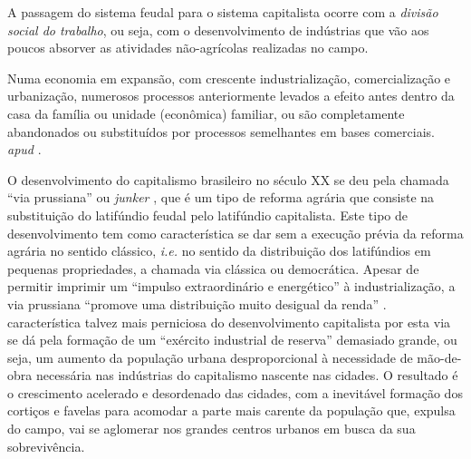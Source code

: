\documentclass[
	12pt,				%
	oneside,			%
	a4paper,			%
	chapter=TITLE,		%
	section=TITLE,		%
	english,			%
	brazil				%
	]{abntex2}
\begin{document}
A passagem do sistema feudal para o sistema capitalista ocorre com a
\emph{divisão social do trabalho}, ou seja, com o desenvolvimento de
indústrias que vão aos poucos absorver as atividades não-agrícolas
realizadas no campo.
\begin{citacao}
Numa economia em expansão, com crescente industrialização, comercialização e
urbanização, numerosos processos anteriormente levados a efeito antes dentro da
casa da família ou unidade (econômica) familiar, ou são completamente
abandonados ou substituídos por processos semelhantes em bases
comerciais. \cite[p. 41]{kuznets} \textit{apud} \cite[p. 218]{rangel1956}.
\end{citacao}
O desenvolvimento do capitalismo brasileiro no século XX se deu pela
chamada ``via prussiana'' ou \emph{junker} \autocite[155]{rangel1988},
que é um tipo de reforma agrária que consiste na substituição do
latifúndio feudal pelo latifúndio capitalista. Este tipo de
desenvolvimento tem como característica se dar sem a execução prévia da
reforma agrária no sentido clássico, \emph{i.e.} no sentido da
distribuição dos latifúndios em pequenas propriedades, a chamada via
clássica ou democrática. Apesar de permitir imprimir um ``impulso
extraordinário e energético'' à industrialização, a via prussiana
``promove uma distribuição muito desigual da renda''
\autocite[155]{rangel1988}. característica talvez mais perniciosa do
desenvolvimento capitalista por esta via se dá pela formação de um
``exército industrial de reserva'' demasiado grande, ou seja, um aumento
da população urbana desproporcional à necessidade de mão-de-obra
necessária nas indústrias do capitalismo nascente nas cidades. O
resultado é o crescimento acelerado e desordenado das cidades, com a
inevitável formação dos cortiços e favelas para acomodar a parte mais
carente da população que, expulsa do campo, vai se aglomerar nos grandes
centros urbanos em busca da sua sobrevivência.
\end{document}
